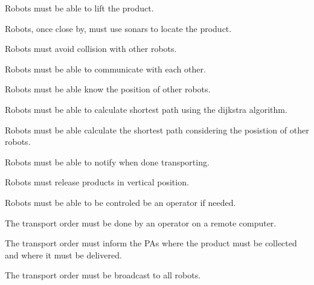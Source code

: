 \begin{FR}
	\item Robots must be able to lift the product. %
	\item Robots, once close by, must use sonars to locate the product. %
	\item Robots must avoid collision with other robots. %
	\item Robots must be able to communicate with each other. %
	\item Robots must be able know the position of other robots. %
	\item Robots must be able to calculate shortest path using the dijkstra algorithm. %
	\item Robots must be able calculate the shortest path considering the posistion of other robots. %
	\item Robots must be able to notify when done transporting. %
	\item Robots must release products in vertical position. %
	\item Robots must be able to be controled be an operator if needed. %
	\item The transport order must be done by an operator on a remote computer. %
	\item The transport order must inform the PAs where the product must be collected and where it must be delivered. %
	\item The transport order must be broadcast to all robots. %
\end{FR}